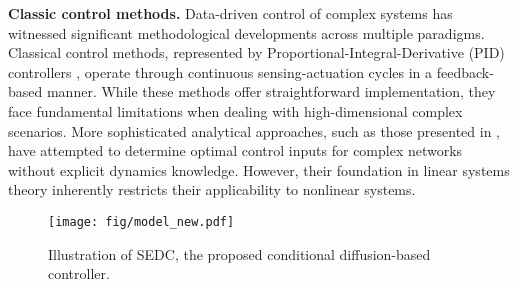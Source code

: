 \textbf{Classic control methods.} Data-driven control of complex systems has witnessed significant methodological developments across multiple paradigms. 
Classical control methods, represented by Proportional-Integral-Derivative (PID) controllers \citep{li2006pid}, operate through continuous sensing-actuation cycles in a feedback-based manner. While these methods offer straightforward implementation, they face fundamental limitations when dealing with high-dimensional complex scenarios. More sophisticated analytical approaches, such as those presented in \citep{baggio2021data}, have attempted to determine optimal control inputs for complex networks without explicit dynamics knowledge. However, their foundation in linear systems theory inherently restricts their applicability to nonlinear systems.

\begin{figure*}[htbp]
    \begin{center}
    \texttt{[image: fig/model\_new.pdf]}    
    \vspace{-10pt}
    \caption{Illustration of SEDC, the proposed conditional diffusion-based controller.}
    \label{fig:model}
    \end{center}

\end{figure*}

